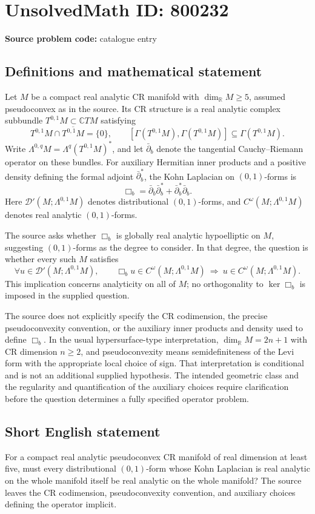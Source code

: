 \documentclass[11pt]{article}
\newcommand{\R}{\mathbb{R}}
\newcommand{\C}{\mathbb{C}}
\begin{document}
\section*{UnsolvedMath ID: 800232}
\textbf{Source problem code:} catalogue entry
\subsection{Definitions and mathematical statement}
Let \(M\) be a compact real analytic CR manifold with \(\dim_{\R}M\geq 5\), assumed pseudoconvex as in the source. Its CR structure is a real analytic complex subbundle \(T^{0,1}M\subset \C TM\) satisfying
\[
T^{0,1}M\cap\overline{T^{0,1}M}=\{0\},
\qquad
[\Gamma(T^{0,1}M),\Gamma(T^{0,1}M)]\subseteq\Gamma(T^{0,1}M).
\]
Write \(\Lambda^{0,q}M=\Lambda^q(T^{0,1}M)^*\), and let \(\bar\partial_b\) denote the tangential Cauchy--Riemann operator on these bundles. For auxiliary Hermitian inner products and a positive density defining the formal adjoint \(\bar\partial_b^*\), the Kohn Laplacian on \((0,1)\)-forms is
\[
\Box_b=\bar\partial_b\bar\partial_b^*+\bar\partial_b^*\bar\partial_b.
\]
Here \(\mathcal D'(M;\Lambda^{0,1}M)\) denotes distributional \((0,1)\)-forms, and \(C^\omega(M;\Lambda^{0,1}M)\) denotes real analytic \((0,1)\)-forms.

The source asks whether \(\Box_b\) is globally real analytic hypoelliptic on \(M\), suggesting \((0,1)\)-forms as the degree to consider. In that degree, the question is whether every such \(M\) satisfies
\[
\forall u\in\mathcal D'(M;\Lambda^{0,1}M),\qquad
\Box_bu\in C^\omega(M;\Lambda^{0,1}M)
\ \Longrightarrow\ 
u\in C^\omega(M;\Lambda^{0,1}M).
\]
This implication concerns analyticity on all of \(M\); no orthogonality to \(\ker\Box_b\) is imposed in the supplied question.

The source does not explicitly specify the CR codimension, the precise pseudoconvexity convention, or the auxiliary inner products and density used to define \(\Box_b\). In the usual hypersurface-type interpretation, \(\dim_{\R}M=2n+1\) with CR dimension \(n\geq2\), and pseudoconvexity means semidefiniteness of the Levi form with the appropriate local choice of sign. That interpretation is conditional and is not an additional supplied hypothesis. The intended geometric class and the regularity and quantification of the auxiliary choices require clarification before the question determines a fully specified operator problem.
\subsection{Short English statement}
For a compact real analytic pseudoconvex CR manifold of real dimension at least five, must every distributional \((0,1)\)-form whose Kohn Laplacian is real analytic on the whole manifold itself be real analytic on the whole manifold? The source leaves the CR codimension, pseudoconvexity convention, and auxiliary choices defining the operator implicit.
\end{document}
